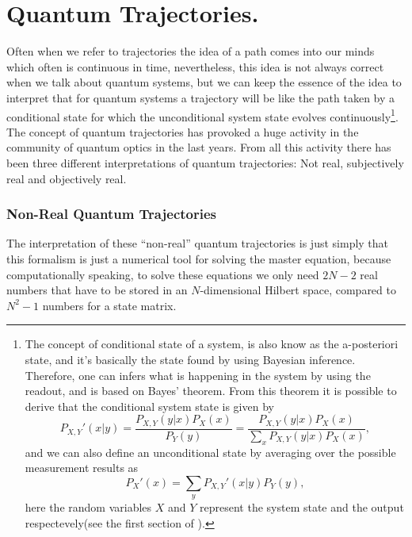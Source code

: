 \chapter{Quantum Trajectories.}
Often when we refer to trajectories the idea of a path comes into our minds which often is continuous in time, nevertheless, this idea is not always correct when we talk about quantum systems,  but we can keep the essence of the idea to interpret that for quantum systems a trajectory will be like the path taken by a conditional state for which the unconditional system state evolves continuously\footnote{The concept of conditional state of a system, is also know as the a-posteriori state, and it's basically the state found by using Bayesian inference. Therefore, one can infers what is happening in the system by using the readout, and is based on Bayes' theorem. From this theorem it is possible to derive that the conditional system state is given by
\[P_{X,Y}'(x|y)=\frac{P_{X,Y}(y|x)P_{X}(x)}{P_{Y}(y)}=\frac{P_{X,Y}(y|x)P_{X}(x)}{\sum_{x}P_{X,Y}(y|x)P_{X}(x)},\]
and we can also define an unconditional state by averaging over the possible measurement results as
\[P_{X}'(x)=\sum_{y}P_{X,Y}'(x|y)P_{Y}(y),\]
here the random variables $X$ and $Y$ represent the system state and the output respectevely(see the first section of \cite{Wiseman}).}.\\
The concept of quantum trajectories has provoked a huge activity in the community of quantum optics in the last years. From all this activity there has been three different interpretations of quantum trajectories: Not real, subjectively real and objectively real\cite{Wisemantrajectories}.
\subsection*{Non-Real Quantum Trajectories}
The interpretation of these ``non-real'' quantum trajectories is just simply that this formalism is just a numerical tool for solving the master equation, because computationally speaking, to solve these equations we only need $2N-2$ real numbers that have to be stored in an $N$-dimensional Hilbert space, compared to $N^{2}-1$ numbers for a state matrix.
